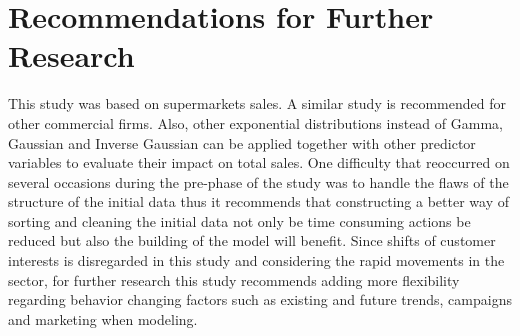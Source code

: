 \section{Recommendations for Further Research}
This study was based on supermarkets sales. A similar study is recommended for other commercial firms. Also, other exponential distributions instead of Gamma, Gaussian and Inverse Gaussian can be applied together with other predictor variables to evaluate their impact on total sales. One difficulty that reoccurred on several occasions during the pre-phase of the study was to handle the flaws of the structure of the initial data thus it recommends that constructing a better way of sorting and cleaning the initial data not only be time consuming actions be reduced but also the building of the model will benefit. Since shifts of customer interests is disregarded in this study and considering the rapid movements in the sector, for further research this study recommends adding more flexibility regarding behavior changing factors such as existing and future trends, campaigns and marketing when modeling.
